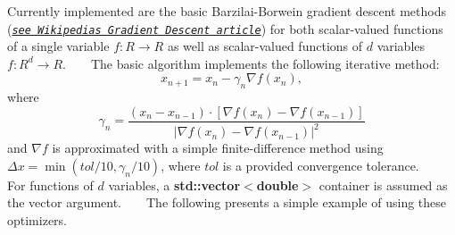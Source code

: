 Currently implemented are the basic Barzilai-\/\+Borwein gradient descent methods ({\itshape \href{https://en.wikipedia.org/wiki/Gradient_descent}{\tt see Wikipedia\textquotesingle{}s \textquotesingle{}Gradient Descent\textquotesingle{} article}}) for both scalar-\/valued functions of a single variable $f:R\longrightarrow R$ as well as scalar-\/valued functions of $d$ variables $ f:R^d\longrightarrow R$. ~\newline
~\newline
 The basic algorithm implements the following iterative method\+: \[ x_{n+1}=x_n-\gamma_n\nabla f(x_n), \] where \[ \gamma_n=\frac{(x_n-x_{n-1})\cdot\left[\nabla f(x_n)-\nabla f(x_{n-1})\right]}{\left|\nabla f(x_n)-\nabla f(x_{n-1})\right|^2} \] and $\nabla f$ is approximated with a simple finite-\/difference method using $\Delta x=\min(tol/10,\gamma_n/10)$, where $tol$ is a provided convergence tolerance. ~\newline
~\newline
 For functions of $d$ variables, a {\bfseries std\+::vector$<$double$>$} container is assumed as the vector argument. ~\newline
~\newline
 The following presents a simple example of using these optimizers. ~\newline
 
